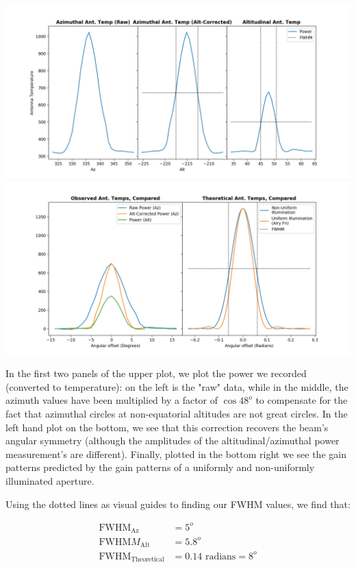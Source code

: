 \documentclass[12pt]{article}
\newenvironment{writeup}[2][Write-Up]{\begin{trivlist}
\item[\hskip \labelsep {\bfseries #1}\hskip \labelsep {\bfseries #2.}]}{\end{trivlist}}
\begin{document}
\begin{writeup}{2}
  \bigskip
  \begin{center}
    \includegraphics[scale=0.5]{part1_1} \\
    \includegraphics[scale=0.5]{part1_2} \\
  \end{center}

In the first two panels of the upper plot, we plot the power we recorded (converted to temperature): on the left is the "raw" data, while in the middle, the azimuth values have been multiplied by a factor of $\cos 48^o$ to compensate for the fact that azimuthal circles at non-equatorial altitudes are not great circles. In the left hand plot on the bottom, we see that this correction recovers the beam's angular symmetry (although the amplitudes of the altitudinal/azimuthal power measurement's are different). Finally, plotted in the bottom right we see the gain patterns predicted by the gain patterns of a uniformly and non-uniformly illuminated aperture.

Using the dotted lines as visual guides to finding our FWHM values, we find that:

\begin{align*}
  \text{FWHM}_{\text{Az}} &= 5^o \\
  \text{FWHM}M_{\text{Alt}} &= 5.8^o \\
  \text{FWHM}_{\text{Theoretical}} &= 0.14 \text{ radians} = 8^o \\
\end{align*}


\end{writeup}
\end{document}
